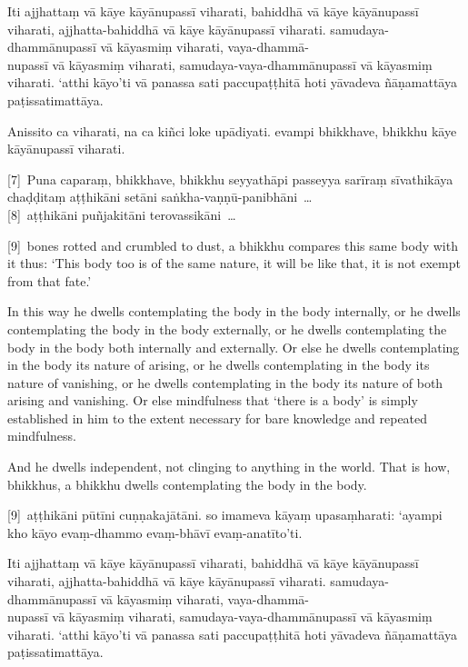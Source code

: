 Iti ajjhattaṃ vā kāye kāyānupassī viharati, bahiddhā vā kāye kāyānupassī
viharati, ajjhatta-bahiddhā vā kāye kāyānupassī viharati. samudaya-dhammānupassī
vā kāyasmiṃ viharati, vaya-dhammā-\\
nupassī vā kāyasmiṃ viharati, samudaya-vaya-dhammānupassī vā kāyasmiṃ viharati.
‘atthi kāyo’ti vā panassa sati paccupaṭṭhitā hoti yāvadeva ñāṇamattāya
paṭissatimattāya.

Anissito ca viharati, na ca kiñci loke upādiyati. evampi bhikkhave, bhikkhu kāye
kāyānupassī viharati.

[7]~Puna caparaṃ, bhikkhave, bhikkhu seyyathāpi passeyya sarīraṃ sīvathikāya chaḍḍitaṃ
aṭṭhikāni setāni saṅkha-vaṇṇū-panibhāni~\ldots{}\\
{}[8]~aṭṭhikāni puñjakitāni terovassikāni~\ldots{}

\englishPage

[9]~bones rotted and crumbled to dust, a bhikkhu compares this same
body with it thus: ‘This body too is of the same nature, it will be like that,
it is not exempt from that fate.’

In this way he dwells contemplating the body in the body internally, or he
dwells contemplating the body in the body externally, or he dwells contemplating
the body in the body both internally and externally. Or else he dwells
contemplating in the body its nature of arising, or he dwells contemplating in
the body its nature of vanishing, or he dwells contemplating in the body its
nature of both arising and vanishing. Or else mindfulness that ‘there is a body’
is simply established in him to the extent necessary for bare knowledge and
repeated mindfulness.

And he dwells independent, not clinging to anything in the world. That is how,
bhikkhus, a bhikkhu dwells contemplating the body in the body.



\paliPage

[9]~aṭṭhikāni pūtīni cuṇṇakajātāni. so imameva kāyaṃ
upasaṃharati: ‘ayampi kho kāyo evaṃ-dhammo evaṃ-bhāvī evaṃ-anatīto’ti.

Iti ajjhattaṃ vā kāye kāyānupassī viharati, bahiddhā vā kāye kāyānupassī
viharati, ajjhatta-bahiddhā vā kāye kāyānupassī viharati. samudaya-dhammānupassī
vā kāyasmiṃ viharati, vaya-dhammā-\\
nupassī vā kāyasmiṃ viharati, samudaya-vaya-dhammānupassī vā kāyasmiṃ viharati.
‘atthi kāyo’ti vā panassa sati paccupaṭṭhitā hoti yāvadeva ñāṇamattāya
paṭissatimattāya.

